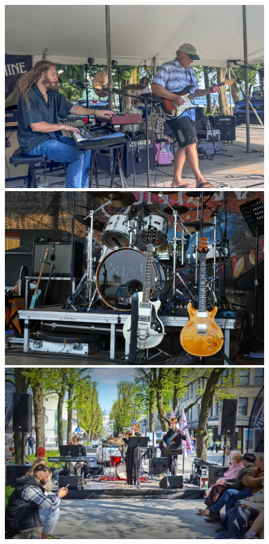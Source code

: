 \begin{figure}
    \begin{minipage}{0.24\textwidth}
        \centering
        \includegraphics[width=\textwidth]{bilder/band-8930763_1280.jpg}
    \end{minipage}
    \begin{minipage}{0.24\textwidth}
        \centering
        \includegraphics[width=\textwidth]{bilder/instruments-4590192_1280.jpg}
    \end{minipage}
    \begin{minipage}{0.24\textwidth}
        \centering
        \includegraphics[width=\textwidth]{bilder/people-9289825_1280.jpg}

\end{minipage}
\end{figure}
